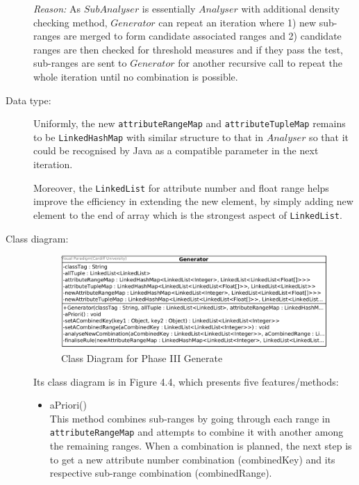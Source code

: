 \begin{description}
\textit{Reason: } As $SubAnalyser$ is essentially $Analyser$ with additional density checking method, $Generator$ can repeat an iteration where 1) new sub-ranges are merged to form candidate associated ranges and 2) candidate ranges are then checked for threshold measures and if they pass the test, sub-ranges are sent to $Generator$ for another recursive call to repeat the whole iteration until no combination is possible.

\item[Data type: ] Uniformly, the new \texttt{attributeRangeMap} and \texttt{attributeTupleMap} remains to be \texttt{LinkedHashMap} with similar structure to that in $Analyser$ so that it could be recognised by Java as a compatible parameter in the next iteration.

Moreover, the \texttt{LinkedList} for attribute number and float range helps improve the efficiency in extending the new element, by simply adding new element to the end of array which is the strongest aspect of \texttt{LinkedList}.

\item[Class diagram: ] 

\begin{figure}[!htbp]
    \centering
    \includegraphics[width=5in]{figures/class_generator}
    \caption[Class Diagram for Phase III Generate]{Class Diagram for Phase III Generate}
    \label{fig:figure4_4}
\end{figure}

Its class diagram is in Figure 4.4, which presents five features/methods:

\begin{itemize}
	\item{aPriori()} \\
	This method combines sub-ranges by going through each range in \texttt{attributeRangeMap} and attempts to combine it with another among the remaining ranges. When a combination is planned, the next step is to get a new attribute number combination (combinedKey) and its respective sub-range combination (combinedRange). 
	

\end{itemize}
\end{description}
